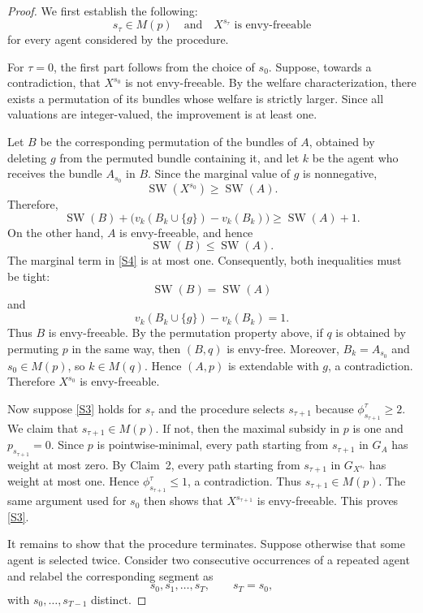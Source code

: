 \begin{proof}
We first establish the following:
\begin{equation}\label{S3}
    s_\tau\in M(p)
\quad\text{and}\quad
X^{s_\tau}\text{ is envy-freeable}
\end{equation}
for every agent considered by the procedure.

For $\tau=0$, the first part follows from the choice of $s_0$. Suppose, towards a contradiction, that $X^{s_0}$ is not
envy-freeable. By the welfare characterization, there exists a permutation of its bundles whose welfare is strictly larger. Since all valuations are integer-valued, the improvement is at
least one.

Let $B$ be the corresponding permutation of the bundles of $A$, obtained by deleting $g$ from the permuted bundle containing it, and let $k$ be the agent who receives the bundle $A_{s_0}$ in $B$. Since the marginal value of $g$ is nonnegative,
\[
\operatorname{SW}(X^{s_0})\geq\operatorname{SW}(A).
\]
Therefore,
\begin{equation}\label{S4}
\operatorname{SW}(B)
+
\bigl(v_k(B_k\cup\{g\})-v_k(B_k)\bigr)
\geq
\operatorname{SW}(A)+1.
\end{equation}
On the other hand, $A$ is envy-freeable, and hence
\[
\operatorname{SW}(B)\leq\operatorname{SW}(A).
\]
The marginal term in \eqref{S4} is at most one. Consequently, both inequalities must be tight:
\[
\operatorname{SW}(B)=\operatorname{SW}(A)
\]
and
\[
v_k(B_k\cup\{g\})-v_k(B_k)=1.
\]
Thus $B$ is envy-freeable. By the permutation property above, if $q$ is obtained by permuting $p$ in the same way, then $(B,q)$ is envy-free. Moreover, $B_k=A_{s_0}$ and $s_0\in M(p)$, so $k\in M(q)$. Hence $(A,p)$ is extendable with $g$, a contradiction. Therefore $X^{s_0}$ is envy-freeable.

Now suppose \eqref{S3} holds for $s_\tau$ and the procedure selects $s_{\tau+1}$ because $\phi^\tau_{s_{\tau+1}}\geq2$. We claim that $s_{\tau+1}\in M(p)$. If not, then the maximal subsidy in $p$ is one and $p_{s_{\tau+1}}=0$. Since $p$ is pointwise-minimal, every path starting from $s_{\tau+1}$ in $G_A$ has weight at most zero. By Claim~2, every path starting from $s_{\tau+1}$ in $G_{X^{s_\tau}}$ has weight at most one. Hence $\phi^\tau_{s_{\tau+1}}\leq1$, a contradiction. Thus $s_{\tau+1}\in M(p)$. The same argument used for $s_0$ then shows that $X^{s_{\tau+1}}$ is envy-freeable. This proves \eqref{S3}.

It remains to show that the procedure terminates. Suppose otherwise that some agent is selected twice. Consider two consecutive occurrences of a repeated agent and relabel the corresponding segment
as
\[
s_0,s_1,\ldots,s_T,
\qquad
s_T=s_0,
\]
with $s_0,\ldots,s_{T-1}$ distinct.


\end{proof}
